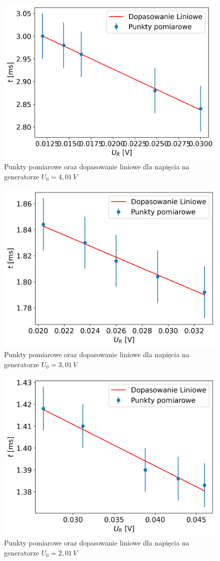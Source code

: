 \documentclass[12pt]{article}
\begin{document}
\begin{figure}[H]
    \centering
    \includegraphics[scale=0.58]{nachylenie_7}
    \caption{Punkty pomiarowe oraz dopasowanie liniowe dla napięcia na generatorze $U_0 = 4{,}01 \, V$}
\end{figure}
\begin{figure}[H]
    \centering
    \includegraphics[scale=0.58]{nachylenie_8}
    \caption{Punkty pomiarowe oraz dopasowanie liniowe dla napięcia na generatorze $U_0 = 3{,}01 \, V$}
\end{figure}
\begin{figure}[H]
    \centering
    \includegraphics[scale=0.58]{nachylenie_9}
    \caption{Punkty pomiarowe oraz dopasowanie liniowe dla napięcia na generatorze $U_0 = 2{,}01 \, V$}
\end{figure}
\end{document}
